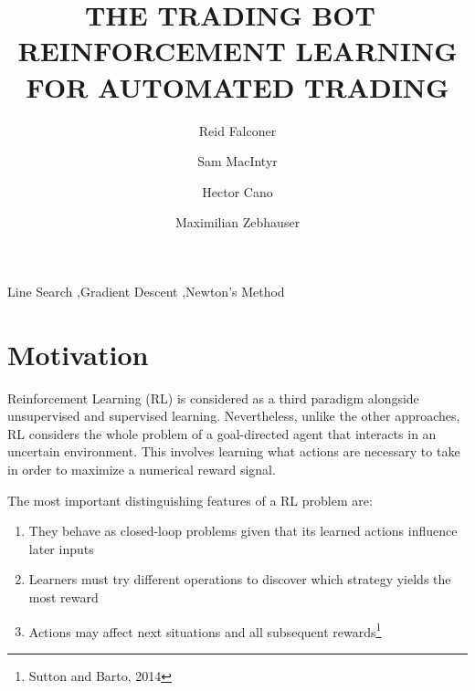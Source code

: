 \documentclass[12pt, authoryear]{elsarticle}
\begin{document}
	
	\begin{frontmatter}  %
		
		\title{THE TRADING BOT\ \vspace{0.5cm} \large \\
			REINFORCEMENT LEARNING FOR AUTOMATED TRADING
		}
		
		\author[Add1]{Reid Falconer}
		
		\author[Add1]{Sam MacIntyr}
		
		\author[Add1]{Hector Cano}

		\author[Add1]{Maximilian Zebhauser}

		
		\address[Add1]{Barcelona Graduate School of Economics, Barcelona, Spain}
		
		
		
		
		\begin{keyword}
			\footnotesize{
				Line Search \sep  Gradient Descent \sep Newton's Method \\ \vspace{0.3cm}
			}
		\end{keyword}
		\vspace{0.5cm}
	\end{frontmatter}
	
	\headsep 25pt %

\section{Motivation}
Reinforcement Learning (RL) is considered as a third paradigm alongside unsupervised and supervised learning. Nevertheless, unlike the other approaches, RL considers the whole problem of a goal-directed agent that interacts in an uncertain environment. This involves learning what actions are necessary to take in order to maximize a numerical reward signal. 

The most important distinguishing features of a RL problem are:
\begin{enumerate}
	\item They behave as closed-loop problems given that its learned actions influence later inputs
	\item Learners must try different operations to discover which strategy yields the most reward
	\item Actions may affect next situations and all subsequent rewards\footnote{Sutton and Barto, 2014}
\end{enumerate}
\end{document}
